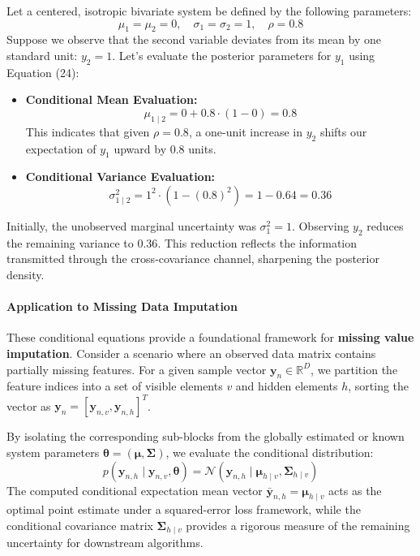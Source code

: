 \documentclass{article}
\begin{document}
\begin{tcolorbox}[colback=green!5!white, colframe=green!60!black, title=Numerical Walkthrough: Verification of Uncertainty Reduction]
Let a centered, isotropic bivariate system be defined by the following parameters:
\begin{equation*}
\mu_1 = \mu_2 = 0, \quad \sigma_1 = \sigma_2 = 1, \quad \rho = 0.8
\end{equation*}
Suppose we observe that the second variable deviates from its mean by one standard unit: $y_2 = 1$. Let's evaluate the posterior parameters for $y_1$ using Equation (24):
\begin{itemize}
    \item \textbf{Conditional Mean Evaluation:}
    \begin{equation*}
    \mu_{1\mid2} = 0 + 0.8 \cdot (1 - 0) = \mathbf{0.8}
    \end{equation*}
    This indicates that given $\rho = 0.8$, a one-unit increase in $y_2$ shifts our expectation of $y_1$ upward by $0.8$ units.
    \item \textbf{Conditional Variance Evaluation:}
    \begin{equation*}
    \sigma_{1\mid2}^2 = 1^2 \cdot \left(1 - (0.8)^2\right) = 1 - 0.64 = \mathbf{0.36}
    \end{equation*}
\end{itemize}
Initially, the unobserved marginal uncertainty was $\sigma_1^2 = 1$. Observing $y_2$ reduces the remaining variance to $0.36$. This reduction reflects the information transmitted through the cross-covariance channel, sharpening the posterior density.
\end{tcolorbox}

\paragraph{Application to Missing Data Imputation}
These conditional equations provide a foundational framework for \textbf{missing value imputation}. Consider a scenario where an observed data matrix contains partially missing features. For a given sample vector $\mathbf{y}_n \in \mathbb{R}^D$, we partition the feature indices into a set of visible elements $v$ and hidden elements $h$, sorting the vector as $\mathbf{y}_n = [\mathbf{y}_{n,v}, \mathbf{y}_{n,h}]^T$.

By isolating the corresponding sub-blocks from the globally estimated or known system parameters $\boldsymbol{\theta} = (\boldsymbol{\mu}, \boldsymbol{\Sigma})$, we evaluate the conditional distribution:
\begin{equation}
p(\mathbf{y}_{n,h} \mid \mathbf{y}_{n,v}, \boldsymbol{\theta}) = \mathcal{N}(\mathbf{y}_{n,h} \mid \boldsymbol{\mu}_{h\mid    v}, \boldsymbol{\Sigma}_{h\mid v}) \tag{25}
\end{equation}
The computed conditional expectation mean vector $\bar{\mathbf{y}}_{n,h} = \boldsymbol{\mu}_{h\mid v}$ acts as the optimal point estimate under a squared-error loss framework, while the conditional covariance matrix $\boldsymbol{\Sigma}_{h\mid v}$ provides a rigorous measure of the remaining uncertainty for downstream algorithms.
\end{document}
